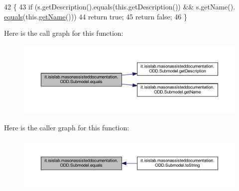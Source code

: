 \begin{DoxyCode}
42                                      \{
43         \textcolor{keywordflow}{if} (s.getDescription().equals(this.getDescription()) && s.getName().
      \hyperlink{classit_1_1isislab_1_1masonassisteddocumentation_1_1_o_d_d_1_1_submodel_afef2a783ff6aaf811ced69506a527265}{equals}(this.\hyperlink{classit_1_1isislab_1_1masonassisteddocumentation_1_1_o_d_d_1_1_submodel_a52d60158adf71622ba8554abb72a12b9}{getName}()))
44             \textcolor{keywordflow}{return} \textcolor{keyword}{true};
45         \textcolor{keywordflow}{return} \textcolor{keyword}{false};
46     \}
\end{DoxyCode}


Here is the call graph for this function\-:
\nopagebreak
\begin{figure}[H]
\begin{center}
\leavevmode
\includegraphics[width=350pt]{classit_1_1isislab_1_1masonassisteddocumentation_1_1_o_d_d_1_1_submodel_afef2a783ff6aaf811ced69506a527265_cgraph}
\end{center}
\end{figure}




Here is the caller graph for this function\-:
\nopagebreak
\begin{figure}[H]
\begin{center}
\leavevmode
\includegraphics[width=350pt]{classit_1_1isislab_1_1masonassisteddocumentation_1_1_o_d_d_1_1_submodel_afef2a783ff6aaf811ced69506a527265_icgraph}
\end{center}
\end{figure}


